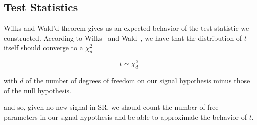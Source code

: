 \documentclass[../../ddppaper2.tex]{subfiles}
\begin{document}
\subsection{Test Statistics}

Wilks and Wald'd theorem gives us an expected behavior of the test statistic we constructed. According to Wilks~\cite{Wilks_Original} and Wald~\cite{Wald_Original}, we have that the distribution of $t$ itself should converge to a $\chi^2_d$

\begin{equation}
    t \sim \chi^2_{d}
\end{equation}

\noindent with $d$ of the number of degrees of freedom on our signal hypothesis minus those of the null hypothesis.

and so, given no new signal in SR, we should count the number of free parameters in our signal hypothesis and be able to approximate the behavior of $t$.
\end{document}
